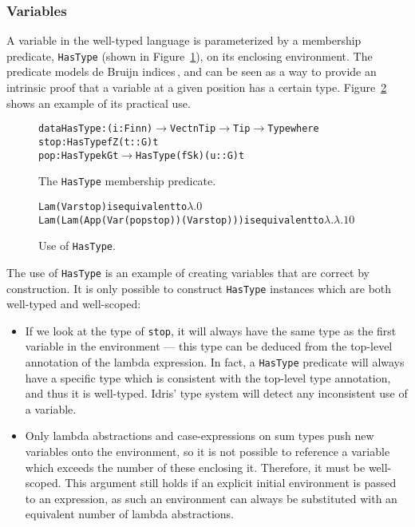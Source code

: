 \subsubsection{Variables}

A variable in the well-typed language is parameterized by a membership predicate, \texttt{HasType} (shown in Figure~\ref{fig:HasType}), on its enclosing environment. The predicate models de Bruijn indices\,\cite{Bruijn72lambdacalculus}, and can be seen as a way to provide an intrinsic proof that a variable at a given position has a certain type. Figure~\ref{fig:HasType-use} shows an example of its practical use.

\begin{figure}
\begin{alltt}
  data HasType : (i : Fin n) \(\rightarrow\) Vect n Tip \(\rightarrow\) Tip \(\rightarrow\) Type where
    stop : HasType fZ (t :: G) t
    pop  : HasType k G t \(\rightarrow\) HasType (fS k) (u :: G) t
\end{alltt}
\caption{The \texttt{HasType} membership predicate.}
\label{fig:HasType}
\end{figure}

\begin{figure}
\begin{alltt}
  Lam (Var stop)                              is equivalent to \(\lambda.0\)
  Lam (Lam (App (Var (pop stop)) (Var stop))) is equivalent to \(\lambda.\lambda.1 0\)
\end{alltt}
\caption{Use of \texttt{HasType}.}
\label{fig:HasType-use}
\end{figure}

The use of \texttt{HasType} is an example of creating variables that are correct by construction. It is only possible to construct \texttt{HasType} instances which are both well-typed and well-scoped:
\begin{itemize}
\item If we look at the type of \texttt{stop}, it will always have the same type as the first variable in the environment --- this type can be deduced from the top-level annotation of the lambda expression. In fact, a \texttt{HasType} predicate will always have a specific type which is consistent with the top-level type annotation, and thus it is well-typed. Idris' type system will detect any inconsistent use of a variable. 
\item Only lambda abstractions and case-expressions on sum types push new variables onto the environment, so it is not possible to reference a variable which exceeds the number of these enclosing it. Therefore, it must be well-scoped. This argument still holds if an explicit initial environment is passed to an expression, as such an environment can always be substituted with an equivalent number of lambda abstractions.
\end{itemize}

